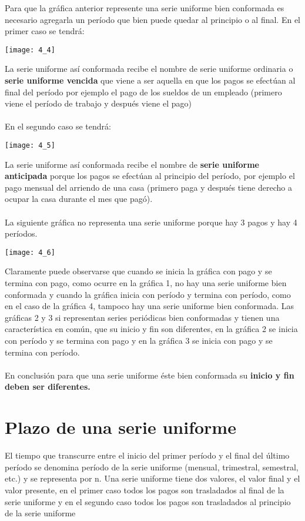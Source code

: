 Para que la gráfica anterior represente una serie uniforme bien conformada es necesario agregarla un período que bien puede quedar al principio o al final. En el primer caso se tendrá:

\begin{center}
	\texttt{[image: 4\_4]}
\end{center}

La serie uniforme así conformada recibe el nombre de serie uniforme ordinaria o \textbf{serie uniforme vencida} que viene a ser aquella en que los pagos se efectúan al final del período por ejemplo el pago de los sueldos de un empleado (primero viene el período de trabajo y después viene el pago) 
\\\\
En el segundo caso se tendrá:

\begin{center}
	\texttt{[image: 4\_5]}
\end{center}

La serie uniforme así conformada recibe el nombre de \textbf{serie uniforme anticipada} porque los pagos se efectúan al principio del período, por ejemplo el pago mensual del arriendo de una casa (primero paga y después tiene derecho a ocupar la casa durante el mes que pagó). 
\\\\
La siguiente gráfica no representa una serie uniforme porque hay 3 pagos y hay 4 períodos.

\begin{center}
	\texttt{[image: 4\_6]}
\end{center}

Claramente puede observarse que cuando se inicia la gráfica con pago y se termina con pago, como ocurre en la gráfica 1, no hay una serie uniforme bien conformada y cuando la gráfica inicia con período y termina con período, como en el caso de la gráfica 4, tampoco hay una serie uniforme bien conformada. Las gráficas 2 y 3 si representan series periódicas bien conformadas y tienen una característica en común, que su inicio y fin son diferentes, en la gráfica 2 se inicia con período y se termina con pago y en la gráfica 3 se inicia con pago y se termina con período.
\\\\
En conclusión para que una serie uniforme éste bien conformada su \textbf{inicio y fin deben ser diferentes.}

\section{Plazo de una serie uniforme}
El tiempo que transcurre entre el inicio del primer período y el final del último período se denomina período de la serie uniforme (mensual, trimestral, semestral, etc.)  y se representa por n.
Una serie uniforme tiene dos valores, el valor final y el valor presente, en el primer caso todos los pagos son trasladados al final de la serie uniforme y en el segundo caso todos los pagos son trasladados al principio de la serie uniforme

